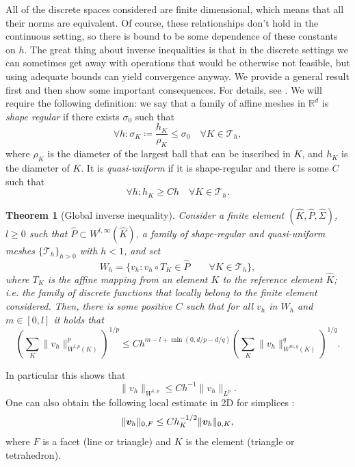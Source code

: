\documentclass{article}
\renewcommand{\vec}{\vectorsym}
\newcommand{\R}{\mathbb{R}}
\newcommand{\T}{\mathcal{T}}
\newtheorem{theorem}{Theorem}
\begin{document}
All of the discrete spaces considered are finite dimensional, which means that all their norms are equivalent. Of course, these relationships don't hold in the continuous setting, so there is bound to be some dependence of these constants on $h$. The great thing about inverse inequalities is that in the discrete settings we can sometimes get away with operations that would be otherwise not feasible, but using adequate bounds can yield convergence anyway. We provide a general result first and then show some important consequences. For details, see \cite{ern2004theory}. We will require the following definition: we say that a family of affine meshes in $\R^d$ is \emph{shape regular} if there exists $\sigma_0$ such that 
    $$ \forall h: \sigma_K\coloneqq \frac{h_K}{\rho_K} \leq \sigma_0 \quad\forall K\in \T_h, $$
where $\rho_K$ is the diameter of the largest ball that can be inscribed in $K$, and $h_K$ is the diameter of $K$. It is \emph{quasi-uniform} if it is shape-regular and there is some $C$ such that
        $$ \forall h: h_K \geq C h \quad \forall K\in \T_h. $$

    \begin{theorem}[Global inverse inequality]
        Consider a finite element $(\hat K, \hat P, \hat \Sigma)$, $l\geq 0$ such that $\hat P\subset W^{l,\infty}(\hat K)$, a family of shape-regular and quasi-uniform meshes $\{\T_h\}_{h>0}$ with $h<1$, and set
            $$ W_h = \{v_h: v_h\circ T_K \in \hat P \qquad\forall K\in \T_h \}, $$
        where $T_K$ is the affine mapping from an element $K$ to the reference element $\hat K$; i.e. the family of discrete functions that locally belong to the finite element considered. Then, there is some positive $C$ such that for all $v_h$ in $W_h$ and $m\in [0,l]$ it holds that
            $$ \left(\sum_K \| v_h\|^p_{W^{l,p}(K)}\right)^{1/p} \leq Ch^{m-l+\min(0, d/p - d/q)} \left(\sum_K \|v_h\|_{W^{m,q}(K)}^q\right)^{1/q}. $$
    \end{theorem}
In particular this shows that
    $$ \| v_h \|_{W^{1,p}} \leq C h^{-1} \| v_h \|_{L^p}. $$
One can also obtain the following local estimate in 2D for simplices \cite{warburton2003constants}:
    $$ \| \vec v_h \|_{0,F} \leq C h_K^{-1/2} \| \vec v_h \|_{0,K}, $$
where $F$ is a facet (line or triangle) and $K$ is the element (triangle or tetrahedron).



\end{document}
